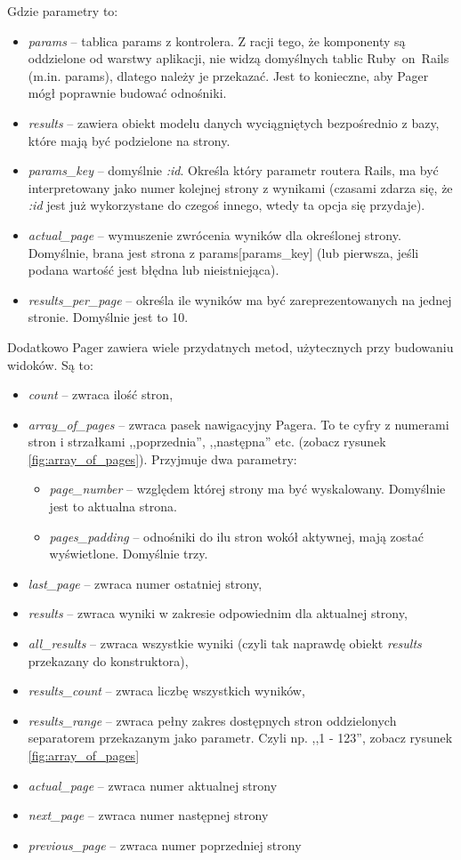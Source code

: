 \documentclass[a4paper,12pt,oneside]{report}
\begin{document}
Gdzie parametry to:
\begin{itemize}
  \item \emph{params} -- tablica params z kontrolera. Z racji tego, że komponenty są oddzielone od warstwy aplikacji, nie widzą domyślnych tablic Ruby~on~Rails (m.in. params), dlatego należy je przekazać. Jest to konieczne, aby Pager mógł poprawnie budować odnośniki.
  \item \emph{results} -- zawiera obiekt modelu danych wyciągniętych bezpośrednio z bazy, które mają być podzielone na strony.
  \item \emph{params\_key} -- domyślnie \emph{:id}. Określa który parametr routera Rails, ma być interpretowany jako numer kolejnej strony z wynikami (czasami zdarza się, że \emph{:id} jest już wykorzystane do czegoś innego, wtedy ta opcja się przydaje).
  \item \emph{actual\_page} -- wymuszenie zwrócenia wyników dla określonej strony. Domyślnie, brana jest strona z params[params\_key] (lub pierwsza, jeśli podana wartość jest błędna lub nieistniejąca).
  \item \emph{results\_per\_page} -- określa ile wyników ma być zareprezentowanych na jednej stronie. Domyślnie jest to 10.
\end{itemize}
Dodatkowo Pager zawiera wiele przydatnych metod, użytecznych przy budowaniu widoków. Są to:
\begin{itemize}
  \item \emph{count} -- zwraca ilość stron,
  \item \emph{array\_of\_pages} -- zwraca pasek nawigacyjny Pagera. To te cyfry z numerami stron i strzałkami ,,poprzednia'', ,,następna'' etc. (zobacz rysunek \ref{fig:array_of_pages}). Przyjmuje dwa parametry:
  \begin{itemize}
    \item \emph{page\_number} -- względem której strony ma być wyskalowany. Domyślnie jest to aktualna strona.
    \item \emph{pages\_padding} -- odnośniki do ilu stron wokół aktywnej, mają zostać wyświetlone. Domyślnie trzy.
  \end{itemize}
  \item \emph{last\_page} -- zwraca numer ostatniej strony,
  \item \emph{results} -- zwraca wyniki w zakresie odpowiednim dla aktualnej strony,
  \item \emph{all\_results} -- zwraca wszystkie wyniki (czyli tak naprawdę obiekt \emph{results} przekazany do konstruktora),
  \item \emph{results\_count} -- zwraca liczbę wszystkich wyników,
  \item \emph{results\_range} -- zwraca pełny zakres dostępnych stron oddzielonych separatorem przekazanym jako parametr. Czyli np. ,,1 - 123'', zobacz rysunek \ref{fig:array_of_pages}
  \item \emph{actual\_page} -- zwraca numer aktualnej strony
  \item \emph{next\_page} -- zwraca numer następnej strony
  \item \emph{previous\_page} -- zwraca numer poprzedniej strony
\end{itemize}
\end{document}
